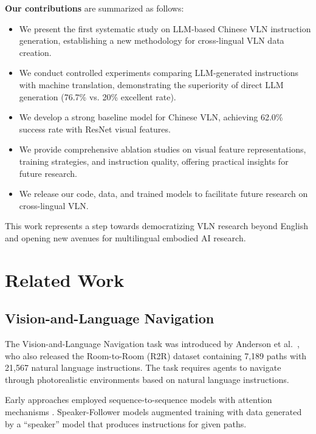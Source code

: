 \documentclass[11pt,a4paper]{article}
\begin{document}
\noindent\textbf{Our contributions} are summarized as follows:

\begin{itemize}
    \item We present the first systematic study on LLM-based Chinese VLN instruction generation, establishing a new methodology for cross-lingual VLN data creation.
    \item We conduct controlled experiments comparing LLM-generated instructions with machine translation, demonstrating the superiority of direct LLM generation (76.7\% vs. 20\% excellent rate).
    \item We develop a strong baseline model for Chinese VLN, achieving 62.0\% success rate with ResNet visual features.
    \item We provide comprehensive ablation studies on visual feature representations, training strategies, and instruction quality, offering practical insights for future research.
    \item We release our code, data, and trained models to facilitate future research on cross-lingual VLN.
\end{itemize}

This work represents a step towards democratizing VLN research beyond English and opening new avenues for multilingual embodied AI research.

\section{Related Work}

\subsection{Vision-and-Language Navigation}

The Vision-and-Language Navigation task was introduced by Anderson et al.~\cite{anderson2018vision}, who also released the Room-to-Room (R2R) dataset containing 7,189 paths with 21,567 natural language instructions. The task requires agents to navigate through photorealistic environments based on natural language instructions.

Early approaches employed sequence-to-sequence models with attention mechanisms \cite{fried2018speaker,ma2019power}. Speaker-Follower models \cite{fried2018speaker} augmented training with data generated by a ``speaker'' model that produces instructions for given paths.
\end{document}
